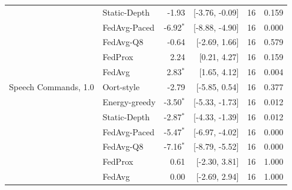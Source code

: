 \begin{tabular}{@{}llrrrr@{}}
 & Static-Depth & -1.93 & [-3.76, -0.09] & 16 & 0.159\\
 & FedAvg-Paced & -6.92$^{*}$ & [-8.88, -4.90] & 16 & 0.000\\
 & FedAvg-Q8 & -0.64 & [-2.69, 1.66] & 16 & 0.579\\
 & FedProx & 2.24 & [0.21, 4.27] & 16 & 0.159\\
 & FedAvg & 2.83$^{*}$ & [1.65, 4.12] & 16 & 0.004\\
\midrule
Speech Commands, 1.0 & Oort-style & -2.79 & [-5.85, 0.54] & 16 & 0.377\\
 & Energy-greedy & -3.50$^{*}$ & [-5.33, -1.73] & 16 & 0.012\\
 & Static-Depth & -2.87$^{*}$ & [-4.33, -1.39] & 16 & 0.012\\
 & FedAvg-Paced & -5.47$^{*}$ & [-6.97, -4.02] & 16 & 0.000\\
 & FedAvg-Q8 & -7.16$^{*}$ & [-8.79, -5.52] & 16 & 0.000\\
 & FedProx & 0.61 & [-2.30, 3.81] & 16 & 1.000\\
 & FedAvg & 0.00 & [-2.69, 2.94] & 16 & 1.000\\
\bottomrule
\end{tabular}